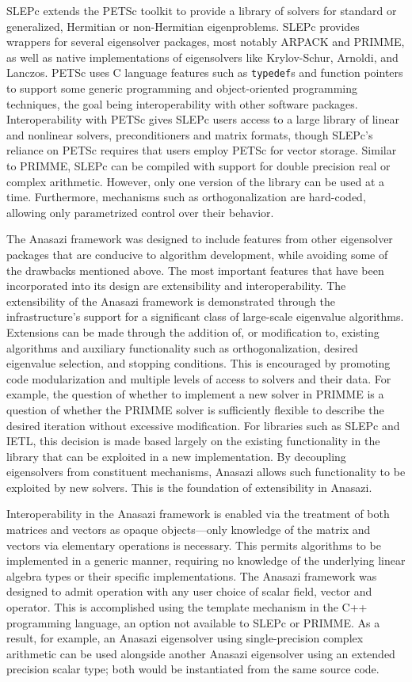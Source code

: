 \documentclass[acmtoms,acmnow]{acmtrans2m}
\begin{document}
SLEPc extends the PETSc toolkit to provide a library of solvers for standard or
generalized, Hermitian or non-Hermitian eigenproblems. SLEPc provides wrappers for several
eigensolver packages, most notably ARPACK and PRIMME, as well as native implementations of
eigensolvers like Krylov-Schur, Arnoldi, and Lanczos. PETSc uses C language features such
as \texttt{typedef}s and function pointers to support some generic programming and
object-oriented programming techniques, the goal being interoperability with other
software packages. Interoperability with PETSc gives SLEPc users access to a large library
of linear and nonlinear solvers, preconditioners and matrix formats, though SLEPc's
reliance on PETSc requires that users employ PETSc for vector storage. Similar to PRIMME,
SLEPc can be compiled with support for double precision real or complex arithmetic.
However, only one version of the library can be used at a time. Furthermore, mechanisms
such as orthogonalization are hard-coded, allowing only parametrized control over their
behavior. 

The Anasazi framework was designed to include features from other eigensolver packages
that are conducive to algorithm development, while avoiding some of the drawbacks
mentioned above. The most important features that have been incorporated into its design
are extensibility and interoperability. The extensibility of the Anasazi framework is
demonstrated through the infrastructure's support for a significant class of large-scale
eigenvalue algorithms. Extensions can be made through the addition of, or modification to,
existing algorithms and auxiliary functionality such as orthogonalization, desired
eigenvalue selection, and stopping conditions. This is encouraged by promoting code
modularization and multiple levels of access to solvers and their data. For example, the
question of whether to implement a new solver in PRIMME is a question of whether the
PRIMME solver is sufficiently flexible to describe the desired iteration without excessive
modification. For libraries such as SLEPc and IETL, this decision is made based largely on
the existing functionality in the library that can be exploited in a new implementation.
By decoupling eigensolvers from constituent mechanisms, Anasazi allows such functionality
to be exploited by new solvers. This is the foundation of extensibility in Anasazi.

Interoperability in the Anasazi framework is enabled via the treatment of both matrices
and vectors as opaque objects---only knowledge of the matrix and vectors via elementary
operations is necessary. This permits algorithms to be implemented in a generic manner,
requiring no knowledge of the underlying linear algebra types or their specific
implementations. The Anasazi framework was designed to admit operation with any user
choice of scalar field, vector and operator. This is accomplished using the template
mechanism in the C++ programming language, an option not available to SLEPc or PRIMME. As
a result, for example, an Anasazi eigensolver using single-precision complex arithmetic
can be used alongside another Anasazi eigensolver using an extended precision scalar type;
both would be instantiated from the same source code.
\end{document}
